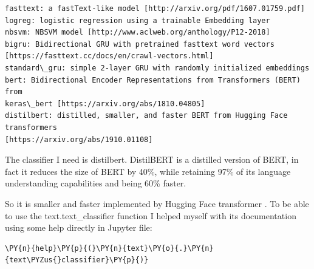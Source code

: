     \begin{Verbatim}[commandchars=\\\{\},fontsize=\footnotesize]
fasttext: a fastText-like model [http://arxiv.org/pdf/1607.01759.pdf]
logreg: logistic regression using a trainable Embedding layer
nbsvm: NBSVM model [http://www.aclweb.org/anthology/P12-2018]
bigru: Bidirectional GRU with pretrained fasttext word vectors
[https://fasttext.cc/docs/en/crawl-vectors.html]
standard\_gru: simple 2-layer GRU with randomly initialized embeddings
bert: Bidirectional Encoder Representations from Transformers (BERT) from
keras\_bert [https://arxiv.org/abs/1810.04805]
distilbert: distilled, smaller, and faster BERT from Hugging Face transformers
[https://arxiv.org/abs/1910.01108]
    \end{Verbatim}

The classifier I need is distilbert. DistilBERT \cite{sanh_distilbert_2020} is a distilled version of BERT, in fact it reduces the size of BERT by 40\%, while retaining 97\% of its language understanding capabilities and being 60\% faster.

So it is smaller and faster implemented by Hugging Face transformer \cite{noauthor_distilbert_nodate}.
To be able to use the text.text\_classifier function I helped myself with its documentation using some help directly in Jupyter file:
 \begin{tcolorbox}[breakable, size=fbox, boxrule=1pt, pad at break*=1mm,colback=cellbackground, colframe=cellborder]
\begin{Verbatim}[commandchars=\\\{\},fontsize=\footnotesize]
\PY{n}{help}\PY{p}{(}\PY{n}{text}\PY{o}{.}\PY{n}{text\PYZus{}classifier}\PY{p}{)}
\end{Verbatim}
\end{tcolorbox}

